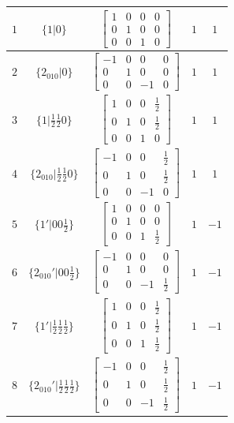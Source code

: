 \documentclass[fleqn,8pt]{jsarticle}
\begin{document}
\begin{longtable}{ccccc}
$ 1 $ & $ \{1|0\} $ & $ \begin{bmatrix} 1 & 0 & 0 & 0 \\ 0 & 1 & 0 & 0 \\ 0 & 0 & 1 & 0 \end{bmatrix} $ & $ 1 $ & $ 1 $ \\ \hline
$ 2 $ & $ \{2{}_{010}|0\} $ & $ \begin{bmatrix} -1 & 0 & 0 & 0 \\ 0 & 1 & 0 & 0 \\ 0 & 0 & -1 & 0 \end{bmatrix} $ & $ 1 $ & $ 1 $ \\ \hline
$ 3 $ & $ \{1|\frac{1}{2} \frac{1}{2} 0\} $ & $ \begin{bmatrix} 1 & 0 & 0 & \frac{1}{2} \\ 0 & 1 & 0 & \frac{1}{2} \\ 0 & 0 & 1 & 0 \end{bmatrix} $ & $ 1 $ & $ 1 $ \\ \hline
$ 4 $ & $ \{2{}_{010}|\frac{1}{2} \frac{1}{2} 0\} $ & $ \begin{bmatrix} -1 & 0 & 0 & \frac{1}{2} \\ 0 & 1 & 0 & \frac{1}{2} \\ 0 & 0 & -1 & 0 \end{bmatrix} $ & $ 1 $ & $ 1 $ \\ \hline
$ 5 $ & $ \{1{}'|0 0 \frac{1}{2}\} $ & $ \begin{bmatrix} 1 & 0 & 0 & 0 \\ 0 & 1 & 0 & 0 \\ 0 & 0 & 1 & \frac{1}{2} \end{bmatrix} $ & $ 1 $ & $ -1 $ \\ \hline
$ 6 $ & $ \{2{}_{010}{}'|0 0 \frac{1}{2}\} $ & $ \begin{bmatrix} -1 & 0 & 0 & 0 \\ 0 & 1 & 0 & 0 \\ 0 & 0 & -1 & \frac{1}{2} \end{bmatrix} $ & $ 1 $ & $ -1 $ \\ \hline
$ 7 $ & $ \{1{}'|\frac{1}{2} \frac{1}{2} \frac{1}{2}\} $ & $ \begin{bmatrix} 1 & 0 & 0 & \frac{1}{2} \\ 0 & 1 & 0 & \frac{1}{2} \\ 0 & 0 & 1 & \frac{1}{2} \end{bmatrix} $ & $ 1 $ & $ -1 $ \\ \hline
$ 8 $ & $ \{2{}_{010}{}'|\frac{1}{2} \frac{1}{2} \frac{1}{2}\} $ & $ \begin{bmatrix} -1 & 0 & 0 & \frac{1}{2} \\ 0 & 1 & 0 & \frac{1}{2} \\ 0 & 0 & -1 & \frac{1}{2} \end{bmatrix} $ & $ 1 $ & $ -1 $ \\
\end{longtable}
\end{document}
